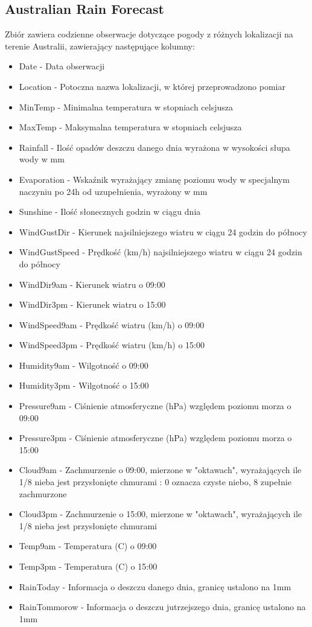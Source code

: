 \documentclass{book}
\begin{document}
\subsection{Australian Rain Forecast}
Zbiór zawiera codzienne obserwacje dotyczące pogody z różnych 
lokalizacji na terenie Australii, zawierający następujące kolumny:
\begin{itemize}
    \item Date - Data obserwacji
    \item Location - Potoczna nazwa lokalizacji, w której przeprowadzono pomiar
    \item MinTemp - Minimalna temperatura w stopniach celsjusza
    \item MaxTemp - Maksymalna temperatura w stopniach celsjusza
    \item Rainfall - Ilość opadów deszczu danego dnia wyrażona w wysokości słupa wody w mm
    \item Evaporation - Wskaźnik wyrażający zmianę poziomu wody w specjalnym naczyniu po 24h od uzupełnienia, wyrażony w mm
    \item Sunshine - Ilość słonecznych godzin w ciągu dnia
    \item WindGustDir - Kierunek najsilniejszego wiatru w ciągu 24 godzin do północy
    \item WindGustSpeed - Prędkość (km/h) najsilniejszego wiatru w ciągu 24 godzin do północy
    \item WindDir9am - Kierunek wiatru o 09:00
    \item WindDir3pm - Kierunek wiatru o 15:00
    \item WindSpeed9am - Prędkość wiatru (km/h) o 09:00
    \item WindSpeed3pm - Prędkość wiatru (km/h) o 15:00
    \item Humidity9am - Wilgotność o 09:00
    \item Humidity3pm - Wilgotność o 15:00
    \item Pressure9am - Ciśnienie atmosferyczne (hPa) względem poziomu morza o 09:00
    \item Pressure3pm - Ciśnienie atmosferyczne (hPa) względem poziomu morza o 15:00
    \item Cloud9am - Zachmurzenie o 09:00, mierzone w "oktawach", wyrażających ile 1/8 nieba jest przysłonięte chmurami : 0 oznacza czyste niebo, 8 zupełnie zachmurzone
    \item Cloud3pm - Zachmurzenie o 15:00, mierzone w "oktawach", wyrażających ile 1/8 nieba jest przysłonięte chmurami
    \item Temp9am - Temperatura (C) o 09:00
    \item Temp3pm - Temperatura (C) o 15:00
    \item RainToday - Informacja o deszczu danego dnia, granicę ustalono na 1mm
    \item RainTommorow - Informacja o deszczu jutrzejszego dnia, granicę ustalono na 1mm
    
\end{itemize}
\end{document}
